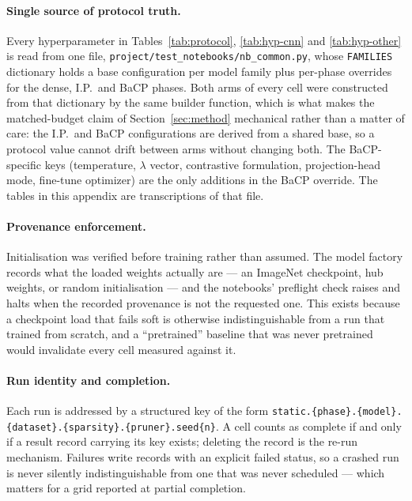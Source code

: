 \paragraph{Single source of protocol truth.}
Every hyperparameter in Tables~\ref{tab:protocol}, \ref{tab:hyp-cnn} and
\ref{tab:hyp-other} is read from one file,
\texttt{project/test\_notebooks/nb\_common.py}, whose \texttt{FAMILIES}
dictionary holds a base configuration per model family plus per-phase overrides
for the dense, I.P.\ and BaCP phases. Both arms of every cell were constructed
from that dictionary by the same builder function, which is what makes the
matched-budget claim of Section~\ref{sec:method} mechanical rather than a matter
of care: the I.P.\ and BaCP configurations are derived from a shared base, so a
protocol value cannot drift between arms without changing both. The
BaCP-specific keys (temperature, $\lambda$ vector, contrastive formulation,
projection-head mode, fine-tune optimizer) are the only additions in the BaCP
override. The tables in this appendix are transcriptions of that file.

\paragraph{Provenance enforcement.}
Initialisation was verified before training rather than assumed. The model
factory records what the loaded weights actually are --- an ImageNet checkpoint,
hub weights, or random initialisation --- and the notebooks' preflight check
raises and halts when the recorded provenance is not the requested one. This
exists because a checkpoint load that fails soft is otherwise indistinguishable
from a run that trained from scratch, and a ``pretrained'' baseline that was
never pretrained would invalidate every cell measured against it.

\paragraph{Run identity and completion.}
Each run is addressed by a structured key of the form
\texttt{static.\{phase\}.\{model\}.\{dataset\}.\{sparsity\}.\{pruner\}.seed\{n\}}.
A cell counts as complete if and only if a result record carrying its key exists;
deleting the record is the re-run mechanism. Failures write records with an
explicit failed status, so a crashed run is never silently indistinguishable from
one that was never scheduled --- which matters for a grid reported at partial
completion.

